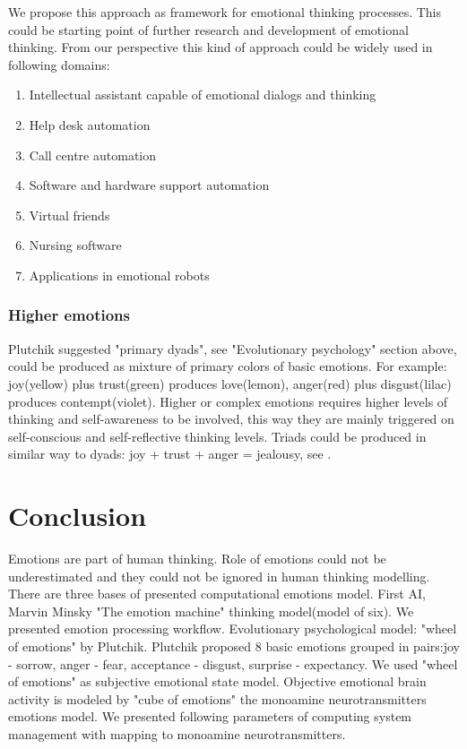 We propose this approach as framework for emotional thinking processes. This could be starting point of further research and development of emotional thinking. From our perspective this kind of approach could be widely used in following domains:

\begin{enumerate}
\item  Intellectual assistant capable of emotional dialogs and thinking
\item  Help desk automation
\item  Call centre automation
\item  Software and hardware support automation
\item  Virtual friends
\item  Nursing software
\item  Applications in emotional robots
\end{enumerate}

\subsubsection{Higher emotions}

Plutchik\cite{natureofemotions} suggested "primary dyads", see "Evolutionary psychology" section above, could be produced as mixture of primary colors of basic emotions. For example: joy(yellow) plus trust(green) produces love(lemon), anger(red) plus disgust(lilac) produces contempt(violet). Higher or complex emotions requires higher levels of thinking and self-awareness to be involved, this way they are mainly triggered on self-conscious and self-reflective thinking levels. Triads could be produced in similar way to dyads: joy + trust + anger = jealousy, see \cite{senticcomputing}.

\section{Conclusion}

Emotions are part of human thinking. Role of emotions could not be underestimated and they could not be ignored in human thinking modelling.
There are three bases of presented computational emotions model. First AI, Marvin Minsky "The emotion machine"\cite{emotionmachine} thinking model(model of six). We presented emotion processing workflow. Evolutionary psychological model: "wheel of emotions" by Plutchik\cite{natureofemotions}. Plutchik proposed 8 basic emotions grouped in pairs:joy - sorrow, anger - fear, acceptance - disgust, surprise - expectancy. We used "wheel of emotions" as subjective emotional state model. Objective emotional brain activity is modeled by "cube of emotions" the monoamine neurotransmitters emotions model. We presented following parameters of computing system management with mapping to monoamine neurotransmitters.

